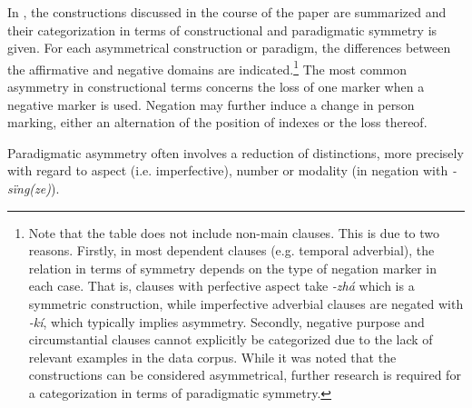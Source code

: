 \documentclass[output=paper,colorlinks,citecolor=brown]{langscibook}
\begin{document}
\largerpage[-4]
In , the constructions discussed in the course of the paper are summarized and their categorization in terms of constructional and paradigmatic symmetry is given. For each asymmetrical construction or paradigm, the differences between the affirmative and negative domains are indicated.\footnote{Note
    that the table does not include non-main clauses. This is due to two reasons. Firstly, in most dependent clauses (e.g. temporal adverbial), the relation in terms of symmetry depends on the type of negation marker in each case. That is, clauses with perfective aspect take \textit{{}-zhá} which is a symmetric construction, while imperfective adverbial clauses are negated with \textit{{}-kí}, which typically implies asymmetry. Secondly, negative purpose and circumstantial clauses cannot explicitly be categorized due to the lack of relevant examples in the data corpus. While it was noted that the constructions can be considered asymmetrical, further research is required for a categorization in terms of paradigmatic symmetry.
} The   most common  asymmetry in constructional terms concerns the loss of one marker when a negative marker is used. Negation may further induce a change in person marking, either an alternation of the position of indexes or the loss thereof.

Paradigmatic asymmetry often involves a reduction of distinctions, more precisely with regard to aspect (i.e. imperfective), number or modality (in negation with \textit{{}-sïng(ze)}).
\end{document}
